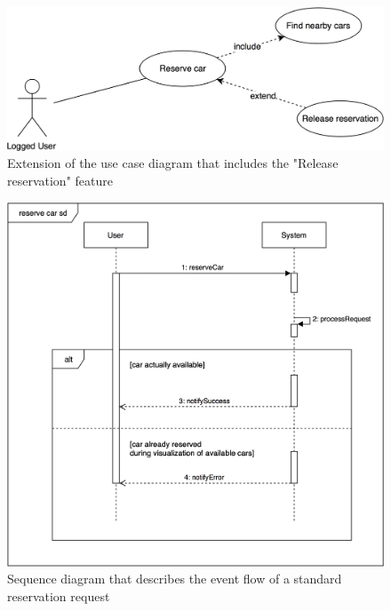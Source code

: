 \begin{figure}[H]
\begin{center}
		\includegraphics[width=\textwidth]{./specific_requirements/features/diagrams/request_car_uc.png}
		\caption{Extension of the use case diagram that includes the "Release reservation" feature}
		\label{request_car_uc}
\end{center}
\end{figure}

\begin{figure}[H]
\begin{center}
		\includegraphics[width=\textwidth]{./specific_requirements/features/diagrams/reserve_car_sd.png}
		\caption{Sequence diagram that describes the event flow of a standard reservation request}
		\label{reserve_car_sd}
\end{center}
\end{figure}

